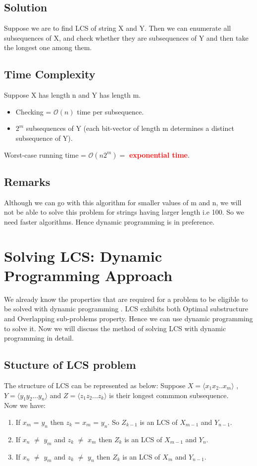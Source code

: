 \documentclass{report}
\begin{document}
    \section{Solution}
    Suppose we are to find LCS of string X and Y.
    Then we can enumerate all subsequences of X, and check whether they are subsequences of Y and then take the longest one among them.
    \section{Time Complexity}
    Suppose X has length n and Y has length m.
    \begin{itemize}
        \item Checking = $\mathcal{O}(n)$ time per subsequence.
        \item $2^m$ subsequences of Y (each bit-vector of length m determines a distinct subsequence of Y).
    \end{itemize}
    Worst-case running time = $\mathcal{O}(n2^m) = $ \textcolor{red}{\textbf{exponential time}}.
    
    \section{Remarks}
    Although we can go with this algorithm for smaller values of m and n, we will not be able to solve this problem for strings having larger length i.e 100. So we need faster algorithms. Hence dynamic programming is in preference.
    
    
    
    
    \chapter{Solving LCS: Dynamic Programming Approach}
    We already know the properties that are required for a problem to be eligible to be solved with dynamic programming . LCS exhibits both Optimal substructure and Overlapping sub-problems property. Hence we can use dynamic programming to solve it. Now we will discuss the method of solving LCS with dynamic programming in detail.
    \section{Stucture of LCS problem}
    The structure of LCS can be represented as below:
    Suppose $X=\langle x_1x_2..x_m\rangle$ , $Y = \langle y_1y_2...y_n\rangle$ and $Z=\langle z_1 z_2...z_k\rangle$ is their longest commmon subsequence.\\
    Now we have:
    \begin{enumerate}
        \item If $x_m$ = $y_n$ then $z_k$ = $x_m$ = $y_n$. So $Z_{k-1}$ is an LCS of $X_{m-1}$ and $Y_{n-1}$.
        \item If $x_n$ $\neq$ $y_m$ and $z_k$ $\neq$ $x_m$ then $Z_k$ is an LCS of $X_{m-1}$ and $Y_n$.
        \item If $x_n$ $\neq$ $y_m$ and $z_k$ $\neq$ $y_n$ then $Z_k$ is an LCS of $X_{m}$ and $Y_{n-1}$.
    \end{enumerate}
\end{document}

